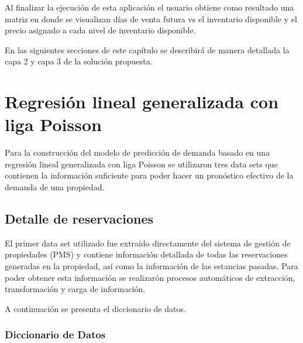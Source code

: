 Al finalizar la ejecución de esta aplicación el usuario obtiene como resultado una matriz en donde se visualizan días de venta futura vs el inventario disponible y el precio asignado a cada nivel de inventario disponible. 

En las siguientes secciones de este capítulo se describirá de manera detallada la capa 2 y capa 3 de la solución propuesta.

\section*{Regresión lineal generalizada con liga Poisson}

Para la construcción del modelo de predicción de demanda basado en una regresión lineal generalizada con liga Poisson se utilizaron tres data sets que contienen la información suficiente para poder hacer un pronóstico efectivo de la demanda de una propiedad.

\subsection*{Detalle de reservaciones}


El primer data set utilizado fue extraído directamente del sistema de gestión de propiedades (PMS) y contiene información detallada de todas las reservaciones generadas en la propiedad, así como la información de las estancias pasadas. Para poder obtener esta información se realizarón procesos automáticos de extracción, transformación y carga de información. 

A continuación se presenta el diccionario de datos.

\subsubsection*{Diccionario de Datos}


